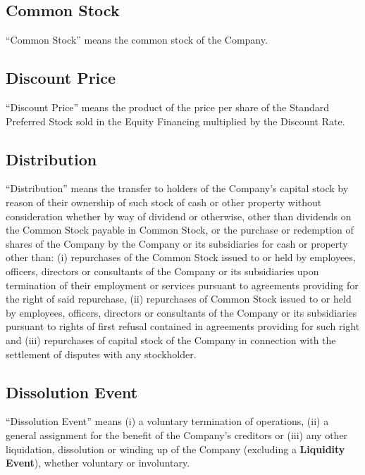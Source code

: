 \subsection{Common Stock}
\label{sec:commonstock}

“Common Stock” means the common stock of the Company.

\ifdiscount
\subsection{Discount Price}
\label{sec:discountprice}

“Discount Price” means the product of the price per share of the
Standard Preferred Stock sold in the Equity Financing multiplied by
the Discount Rate.

\fi
\subsection{Distribution}
\label{sec:distribution}

“Distribution” means the transfer to holders of the Company’s capital
stock by reason of their ownership of such stock of cash or other
property without consideration whether by way of dividend or
otherwise, other than dividends on the Common Stock payable in Common
Stock, or the purchase or redemption of shares of the Company by the
Company or its subsidiaries for cash or property other than: (i)
repurchases of the Common Stock issued to or held by employees,
officers, directors or consultants of the Company or its subsidiaries
upon termination of their employment or services pursuant to
agreements providing for the right of said repurchase, (ii)
repurchases of Common Stock issued to or held by employees, officers,
directors or consultants of the Company or its subsidiaries pursuant
to rights of first refusal contained in agreements providing for such
right and (iii) repurchases of capital stock of the Company in
connection with the settlement of disputes with any stockholder.

\subsection{Dissolution Event}
\label{sec:dissolutioneventdef}

“Dissolution Event” means (i) a voluntary termination of operations,
(ii) a general assignment for the benefit of the Company’s creditors
or (iii) any other liquidation, dissolution or winding up of the
Company (excluding a \textbf{Liquidity Event}), whether voluntary or
involuntary.

